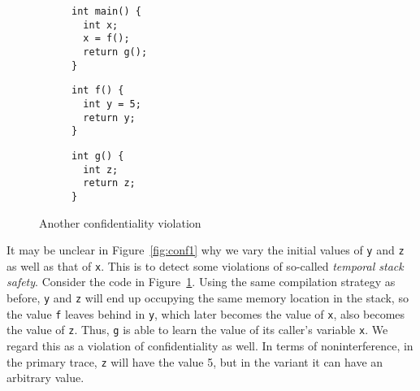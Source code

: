 \documentclass[10pt,conference]{ieeetran}%
\theoremstyle{definition}
\begin{document}
\begin{figure}
\begin{subfigure}[t]{.28\columnwidth}
  {\small
\begin{lstlisting}
int main() {
  int x;
  x = f();
  return g();
}
\end{lstlisting}
  }
\end{subfigure}
\begin{subfigure}[t]{.27\columnwidth}
  {\small
\begin{lstlisting}[backgroundcolor=\color{lgray}]
int f() {
  int y = 5;
  return y;
}
\end{lstlisting}
  }
\end{subfigure}
\begin{subfigure}[t]{.32\columnwidth}
  {\small
\begin{lstlisting}
int g() {
  int z;
  return z;
}
\end{lstlisting}
  }
\end{subfigure}
\caption{Another confidentiality violation}
\vspace*{-1em}
\label{fig:conf2}
\end{figure}


It may be unclear in Figure~\ref{fig:conf1} why we vary the initial values of {\tt y}
and {\tt z} as well as that of {\tt x}. This is to detect some violations of so-called
{\em temporal stack safety}.
Consider the code in Figure~\ref{fig:conf2}.
Using the same compilation strategy as before, {\tt y} and {\tt z} will end up occupying the
same memory location in the stack,
so the value {\tt f} leaves behind in {\tt y}, which later becomes the value of {\tt x}, also
becomes the value of {\tt z}. Thus, {\tt g} is able to learn the value of its caller's
variable {\tt x}.  We regard this as a violation of confidentiality as well. In terms of noninterference,
in the primary trace, {\tt z} will have the value 5, but in the variant it can have
an arbitrary value.
\end{document}

